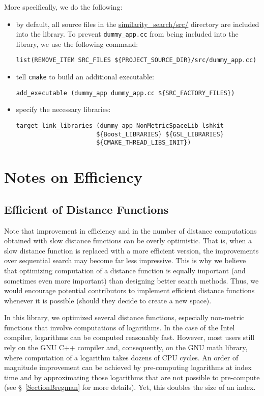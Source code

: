 \documentclass[runningheads,a4paper]{llncs}
\newcommand{\ttt}[1]{\texttt{#1}}
\begin{document}
\newpage
More specifically, we do the following:
\begin{itemize}
\item by default, all source files in the  
\href{https://github.com/searchivarius/NonMetricSpaceLib/blob/master/similarity_search/src/}{similarity\_search/src/} directory are included into the library.
To prevent \ttt{dummy\_app.cc} from being included into the library, we use the following command:
\begin{verbatim}
list(REMOVE_ITEM SRC_FILES ${PROJECT_SOURCE_DIR}/src/dummy_app.cc)
\end{verbatim}

\item tell \ttt{cmake} to build an additional executable:
\begin{verbatim}
add_executable (dummy_app dummy_app.cc ${SRC_FACTORY_FILES})
\end{verbatim}

\item specify the necessary libraries:
\begin{verbatim}
target_link_libraries (dummy_app NonMetricSpaceLib lshkit 
                      ${Boost_LIBRARIES} ${GSL_LIBRARIES} 
                      ${CMAKE_THREAD_LIBS_INIT})
\end{verbatim}
\end{itemize}

\section{Notes on Efficiency}\label{SectionEfficiency}
\subsection{Efficient of Distance Functions}
Note that improvement in efficiency and in the number of distance computations
obtained with slow distance functions can be overly optimistic.
That is, when a slow distance function is replaced with a more efficient version,
the improvements over sequential search may become far less impressive.
This is why we believe that optimizing  computation of a distance function 
is equally important (and sometimes even more important) 
than designing better search methods.
Thus, we would encourage potential contributors to 
implement efficient distance functions whenever it is possible 
(should they decide to create a new space).

In this library, we optimized several distance functions, 
especially non-metric functions that involve computations of logarithms.
In the case of the Intel compiler, logarithms can be computed reasonably fast.
However, most users still rely on the GNU C++ compiler and, consequently, on the GNU math library, 
where computation of a logarithm takes dozens of CPU cycles.
An order of magnitude improvement can be achieved by pre-computing 
logarithms at index time and by approximating those logarithms that are not possible
to pre-compute (see \S~\ref{SectionBregman} for more details).
Yet, this doubles the size of an index.
\end{document}
